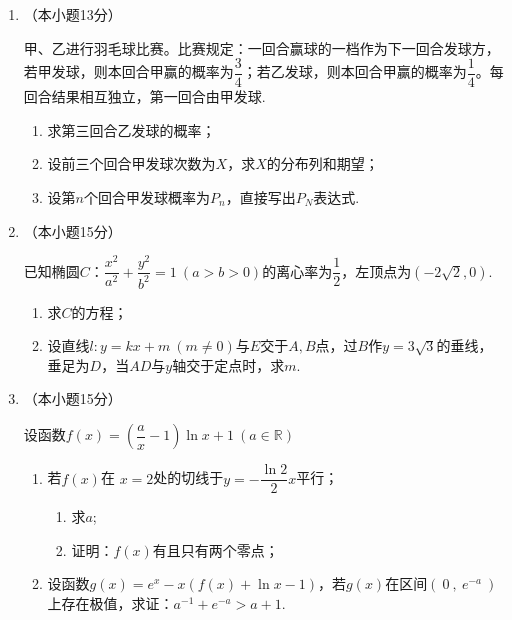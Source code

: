\documentclass[11pt,a4paper]{ctexart}
\begin{document}
\begin{enumerate}[start=16]
\begin{flushright}
    \end{flushright}

    \newpage
    \item （本小题13分）
    
    甲、乙进行羽毛球比赛。比赛规定：一回合赢球的一档作为下一回合发球方，若甲发球，则本回合甲赢的概率为$\dfrac{3}{4}$；若乙发球，则本回合甲赢的概率为$\dfrac{1}{4}$。每回合结果相互独立，第一回合由甲发球.
    \begin{enumerate}[label=(\Roman*)]
        \item 求第三回合乙发球的概率；
        \item 设前三个回合甲发球次数为$X$，求$X$的分布列和期望；
        \item 设第$n$个回合甲发球概率为$P_n$，直接写出$P_N$表达式.
    \end{enumerate}
    
    \item （本小题15分）
    
    已知椭圆$C$：$\dfrac{x^2}{a^2}+\dfrac{y^2}{b^2}=1\ (a>b>0)$的离心率为$\dfrac{1}{2}$，左顶点为$(-2\sqrt{2},0)$.
    \begin{enumerate}[label=(\Roman*)]
        \item 求$C$的方程；
        \item 设直线$l:y=kx+m\ (m \neq 0)$与$E$交于$A,B$点，过$B$作$y=3 \sqrt{3}$的垂线，垂足为$D$，当$AD$与$y$轴交于定点时，求$m$.
    \end{enumerate}

    \item （本小题15分）

    设函数$f(x)=(\dfrac{a}{x}-1) \ln x+1 \ (a \in \mathbb{R})$
    \begin{enumerate}[label=(\Roman*)]
        \item 若$f(x)$在 $x=2$处的切线于$y=-\dfrac{\ln 2}{2}x$平行；
         \begin{enumerate}[label=(\roman*)]
         \item 求$a$;
         \item 证明：$f(x)$有且只有两个零点；
         \end{enumerate}
        \item 设函数$g(x)=e^x-x(f(x)+\ln x-1)$，若$g(x)$在区间$(\ 0\ ,\  e^{-a}\ )$上存在极值，求证：$a^{-1}+e^{-a}>a+1$.
    \end{enumerate}
    
\end{enumerate}
\end{document}
